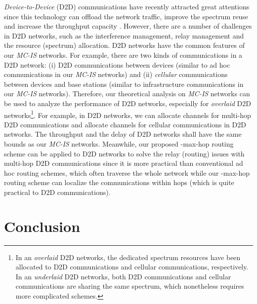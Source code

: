 \documentclass[10pt,journal]{IEEEtran}
\begin{document}
\emph{Device-to-Device} (D2D) communications have recently attracted great attentions since this technology can  offload the network traffic, improve the spectrum reuse and increase the throughput capacity \cite{Asadi:CST14,Tehrani:IEEECommMag14}. However, there are a number of challenges in D2D networks, such as the interference management, relay management and the resource (spectrum) allocation. D2D networks have the common features of our \emph{MC-IS} networks. For example, there are two kinds of communications in a D2D network: (i) D2D communications between devices (similar to ad hoc communications in our \emph{MC-IS} networks) and (ii) \emph{cellular} communications between devices and base stations (similar to infrastructure communications in our \emph{MC-IS} networks). Therefore, our theoretical analysis on \emph{MC-IS} networks can be used to analyze the performance of D2D networks, especially for \emph{overlaid} D2D networks\footnote{In an \emph{overlaid} D2D networks, the dedicated spectrum resources have been allocated to D2D communications and cellular communications, respectively. In an \emph{underlaid} D2D networks, both D2D communications and cellular communications are sharing the same spectrum, which nonetheless requires more complicated schemes.}. For example, in D2D networks, we can allocate  channels for multi-hop D2D communications and allocate  channels for cellular communications in D2D networks. The throughput and the delay of D2D networks shall have the same bounds as our \emph{MC-IS} networks. Meanwhile, our proposed -max-hop routing scheme can be applied to D2D networks to solve the relay (routing) issues with multi-hop D2D communications \cite{SWJeon:icc15,YQian:TVT15} since it is more practical than conventional ad hoc routing schemes, which often traverse the whole network while our -max-hop routing scheme can localize the communications within  hops (which is quite practical to D2D communications). 



\section{Conclusion}
\label{sec:conclusion}
\end{document}
